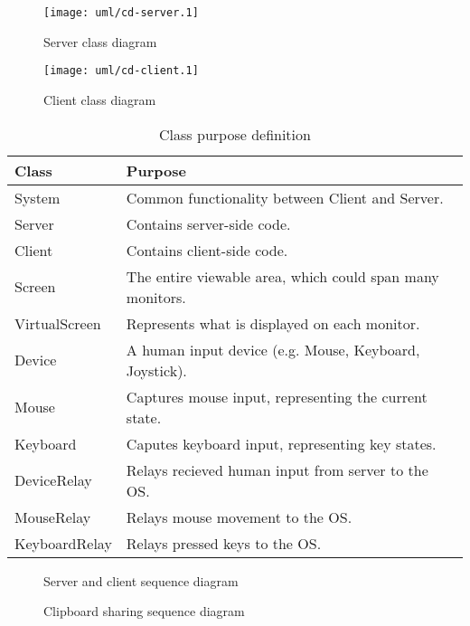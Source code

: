 \begin{figure}[ht!]
  \begin{center}
    \texttt{[image: uml/cd-server.1]}
    \caption{Server class diagram}
    \label{fig:serverClassDiagram}
  \end{center}
\end{figure}

\begin{figure}[ht!]
  \begin{center}
    \texttt{[image: uml/cd-client.1]}
    \caption{Client class diagram}
    \label{fig:clientClassDiagram}
  \end{center}
\end{figure}

\begin{table}[ht!]
  \begin{tabular}{|l|l|}
    \hline
    \textbf{Class} & \textbf{Purpose} \\
    \hline
    System & Common functionality between Client and Server. \\
    Server & Contains server-side code. \\
    Client & Contains client-side code. \\
    Screen & The entire viewable area, which could span many monitors. \\
    VirtualScreen & Represents what is displayed on each monitor. \\
    Device & A human input device (e.g. Mouse, Keyboard, Joystick). \\
    Mouse & Captures mouse input, representing the current state. \\
    Keyboard & Caputes keyboard input, representing key states. \\
    DeviceRelay & Relays recieved human input from server to the OS. \\
    MouseRelay & Relays mouse movement to the OS. \\
    KeyboardRelay & Relays pressed keys to the OS. \\
    \hline
  \end{tabular}
  \caption{Class purpose definition}
  \label{tab:classes}
\end{table}

\begin{figure}
  \centering
  
  \caption{Server and client sequence diagram}
\end{figure}

\begin{figure}
  \centering
  
  \caption{Clipboard sharing sequence diagram}
\end{figure}
